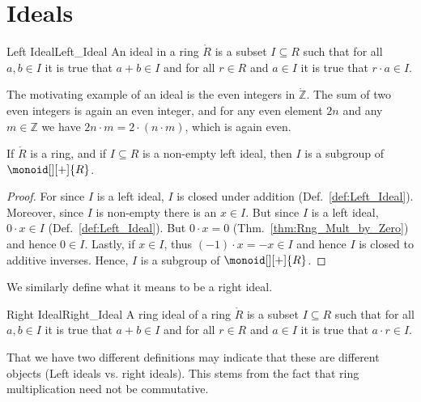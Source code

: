 \documentclass{article}                                                        %
\begin{document}
    \section{Ideals}
        \begin{fdefinition}{Left Ideal}{Left_Ideal}
            An ideal in a ring $\ring{R}$ is a subset $I\subseteq{R}$ such that
            for all $a,b\in{I}$ it is true that $a+b\in{I}$ and for all
            $r\in{R}$ and $a\in{I}$ it is true that $r\cdot{a}\in{I}$.
        \end{fdefinition}
        \begin{example}
            The motivating example of an ideal is the even integers
            in $\ring{\mathbb{Z}}$. The sum of two even integers is again an
            even integer, and for any even element $2n$ and any $m\in\mathbb{Z}$
            we have $2n\cdot{m}=2\cdot(n\cdot{m})$, which is again even.
        \end{example}
        \begin{theorem}
            \label{thm:Left_Ideal_is_Additive_Subgroup}%
            If $\ring{R}$ is a ring, and if $I\subseteq{R}$ is a non-empty left
            ideal, then $I$ is a subgroup of $\monoid[][+]{R}$.
        \end{theorem}
        \begin{proof}
            For since $I$ is a left ideal, $I$ is closed under addition
            (Def.~\ref{def:Left_Ideal}). Moreover, since $I$ is non-empty there
            is an $x\in{I}$. But since $I$ is a left ideal, $0\cdot{x}\in{I}$
            (Def.~\ref{def:Left_Ideal}). But $0\cdot{x}=0$
            (Thm.~\ref{thm:Rng_Mult_by_Zero}) and hence $0\in{I}$. Lastly, if
            $x\in{I}$, thus $(\minus{1})\cdot{x}=\minus{x}\in{I}$ and hence
            $I$ is closed to additive inverses. Hence, $I$ is a subgroup of
            $\monoid[][+]{R}$.
        \end{proof}
        We similarly define what it means to be a right ideal.
        \begin{fdefinition}{Right Ideal}{Right_Ideal}
            A ring ideal of a ring $\ring{R}$ is a subset $I\subseteq{R}$ such
            that for all $a,b\in{I}$ it is true that $a+b\in{I}$ and for all
            $r\in{R}$ and $a\in{I}$ it is true that $a\cdot{r}\in{I}$.
        \end{fdefinition}
        That we have two different definitions may indicate that these are
        different objects (Left ideals vs. right ideals). This stems from the
        fact that ring multiplication need not be commutative.
\end{document}
